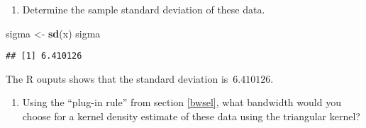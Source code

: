 \documentclass[
  a4paper,
]{article}
\newenvironment{Shaded}{\begin{snugshade}}{\end{snugshade}}
\newcommand{\FunctionTok}[1]{\textcolor[rgb]{0.13,0.29,0.53}{\textbf{#1}}}
\newcommand{\NormalTok}[1]{#1}
\newcommand{\OtherTok}[1]{\textcolor[rgb]{0.56,0.35,0.01}{#1}}
\providecommand{\tightlist}{%
  \setlength{\itemsep}{0pt}\setlength{\parskip}{0pt}}
\theoremstyle{definition}
\theoremstyle{definition}
\theoremstyle{definition}
\theoremstyle{definition}
\theoremstyle{remark}
\begin{document}
\begin{enumerate}
\def\labelenumi{\alph{enumi}.}
\tightlist
\item
  Determine the sample standard deviation of these data.
\end{enumerate}

\begin{myanswers}

\begin{Shaded}
\begin{Highlighting}[]
\NormalTok{sigma }\OtherTok{\textless{}{-}} \FunctionTok{sd}\NormalTok{(x)}
\NormalTok{sigma}
\end{Highlighting}
\end{Shaded}

\begin{verbatim}
## [1] 6.410126
\end{verbatim}

The R ouputs shows that the standard deviation is~\(6.410126\).

\end{myanswers}

\begin{enumerate}
\def\labelenumi{\alph{enumi}.}
\setcounter{enumi}{1}
\tightlist
\item
  Using the ``plug-in rule'' from section \ref{bwsel}, what bandwidth would you
  choose for a kernel density estimate of these data using the triangular kernel?
\end{enumerate}
\end{document}
